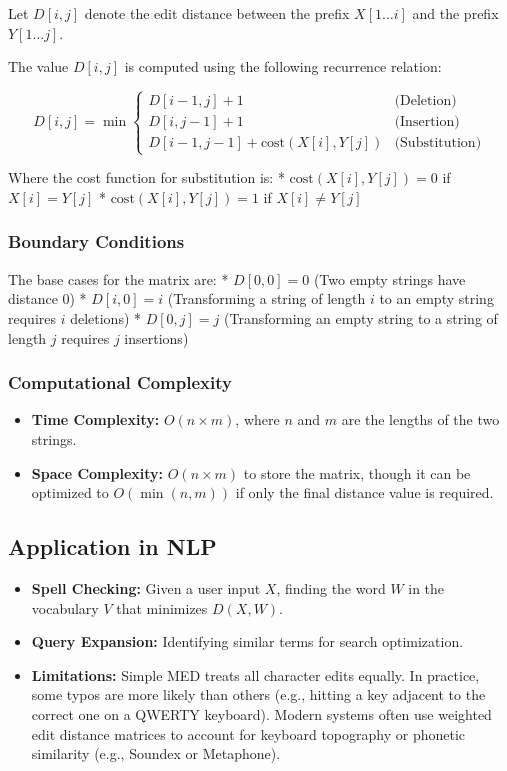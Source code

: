 \documentclass[
  italian,
  11pt,
]{article}
\providecommand{\tightlist}{%
  \setlength{\itemsep}{0pt}\setlength{\parskip}{0pt}}
\begin{document}
Let \(D[i, j]\) denote the edit distance between the prefix
\(X[1 \dots i]\) and the prefix \(Y[1 \dots j]\).

The value \(D[i, j]\) is computed using the following recurrence
relation:

\[
D[i, j] = \min \begin{cases} 
D[i-1, j] + 1 & \text{(Deletion)} \\
D[i, j-1] + 1 & \text{(Insertion)} \\
D[i-1, j-1] + \text{cost}(X[i], Y[j]) & \text{(Substitution)}
\end{cases}
\]

Where the cost function for substitution is: *
\(\text{cost}(X[i], Y[j]) = 0\) if \(X[i] = Y[j]\) *
\(\text{cost}(X[i], Y[j]) = 1\) if \(X[i] \neq Y[j]\)

\subsubsection{Boundary Conditions}\label{boundary-conditions}

The base cases for the matrix are: * \(D[0, 0] = 0\) (Two empty strings
have distance 0) * \(D[i, 0] = i\) (Transforming a string of length
\(i\) to an empty string requires \(i\) deletions) * \(D[0, j] = j\)
(Transforming an empty string to a string of length \(j\) requires \(j\)
insertions)

\subsubsection{Computational Complexity}\label{computational-complexity}

\begin{itemize}
\tightlist
\item
  \textbf{Time Complexity:} \(O(n \times m)\), where \(n\) and \(m\) are
  the lengths of the two strings.
\item
  \textbf{Space Complexity:} \(O(n \times m)\) to store the matrix,
  though it can be optimized to \(O(\min(n, m))\) if only the final
  distance value is required.
\end{itemize}

\subsection{Application in NLP}\label{application-in-nlp}

\begin{itemize}
\tightlist
\item
  \textbf{Spell Checking:} Given a user input \(X\), finding the word
  \(W\) in the vocabulary \(V\) that minimizes \(D(X, W)\).
\item
  \textbf{Query Expansion:} Identifying similar terms for search
  optimization.
\item
  \textbf{Limitations:} Simple MED treats all character edits equally.
  In practice, some typos are more likely than others (e.g., hitting a
  key adjacent to the correct one on a QWERTY keyboard). Modern systems
  often use weighted edit distance matrices to account for keyboard
  topography or phonetic similarity (e.g., Soundex or Metaphone).
\end{itemize}
\end{document}
